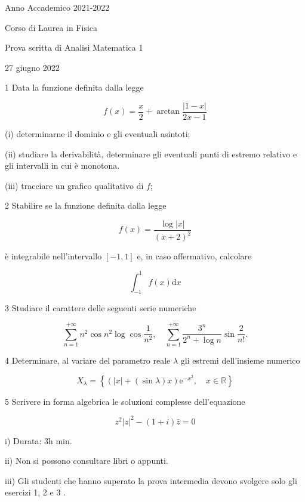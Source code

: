 \documentclass[10pt]{article}
\begin{document}
Anno Accademico 2021-2022

Corso di Laurea in Fisica

Prova scritta di Analisi Matematica 1

27 giugno 2022

1 Data la funzione definita dalla legge

\[
f(x)=\frac{x}{2}+\arctan \frac{|1-x|}{2 x-1}
\]

(i) determinarne il dominio e gli eventuali asintoti;

(ii) studiare la derivabilità, determinare gli eventuali punti di estremo relativo e gli intervalli in cui è monotona.

(iii) tracciare un grafico qualitativo di \(f\);

2 Stabilire se la funzione definita dalla legge

\[
f(x)=\frac{\log |x|}{(x+2)^{2}}
\]

è integrabile nell'intervallo \([-1,1]\) e, in caso affermativo, calcolare

\[
\int_{-1}^{1} f(x) \mathrm{d} x
\]

3 Studiare il carattere delle seguenti serie numeriche

\[
\sum_{n=1}^{+\infty} n^{2} \cos n^{2} \log \cos \frac{1}{n^{2}}, \quad \sum_{n=1}^{+\infty} \frac{3^{n}}{2^{n}+\log n} \sin \frac{2}{n !} .
\]

4 Determinare, al variare del parametro reale \(\lambda\) gli estremi dell'insieme numerico

\[
X_{\lambda}=\left\{(|x|+(\sin \lambda) x) \mathrm{e}^{-x^{2}}, \quad x \in \mathbb{R}\right\}
\]

5 Scrivere in forma algebrica le soluzioni complesse dell'equazione

\[
z^{2}|z|^{2}-(1+i) \bar{z}=0
\]

i) Durata: 3h min.

ii) Non si possono consultare libri o appunti.

iii) Gli studenti che hanno superato la prova intermedia devono svolgere solo gli esercizi 1, 2 e 3 .
\end{document}
